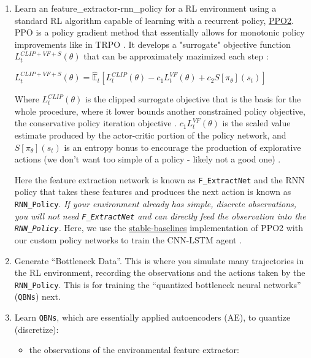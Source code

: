 \begin{enumerate}
\def\labelenumi{\arabic{enumi}.}
\item
  Learn an feature\_extractor-rnn\_policy for a RL environment using a
  standard RL algorithm capable of learning with a recurrent policy,
  \href{https://openai.com/blog/openai-baselines-ppo/}{PPO2}. PPO is a policy gradient method that essentially allows for monotonic policy improvements like in TRPO \cite{TRPO}\cite{PPO2}. It develops a "surrogate" objective function $L_{t}^{C L I P+V F+S}(\theta)$ that can be approximately mazimized each step \cite{PPO2}:
  
  \(L_{t}^{C L I P+V F+S}(\theta)=\hat{\mathbb{E}}_{t}\left[L_{t}^{C L I P}(\theta)-c_{1} L_{t}^{V F}(\theta)+c_{2} S\left[\pi_{\theta}\right]\left(s_{t}\right)\right]\)
  
  Where $L_{t}^{C L I P}(\theta)$ is the clipped surrogate objective that is the basis for the whole procedure, where it lower bounds another constrained policy objective, the conservative policy iteration objective \cite{PPO2}. $c_{1} L_{t}^{V F}(\theta)$ is the scaled value estimate produced by the actor-critic portion of the policy network, and $S\left[\pi_{\theta}\right]\left(s_{t}\right)$ is an entropy bonus to encourage the production of explorative actions (we don't want too simple of a policy - likely not a good one) \cite{PPO2}.
  
  Here the feature extraction network is known as \texttt{F\_ExtractNet} and the
  RNN policy that takes these features and produces the next action is
  known as \texttt{RNN\_Policy}. \emph{If your environment already has
  simple, discrete observations, you will not need
  \texttt{F\_ExtractNet} and can directly feed the observation into the
  \texttt{RNN\_Policy}.} Here, we use the \href{https://stable-baselines.readthedocs.io/}{stable-baselines} implementation of PPO2 with our custom policy networks to train the CNN-LSTM agent \cite{stable-baselines}.
\item
  Generate ``Bottleneck Data''. This is where you simulate many
  trajectories in the RL environment, recording the observations and the
  actions taken by the \texttt{RNN\_Policy}. This is for training the
  ``quantized bottleneck neural networks'' (\texttt{QBNs}) next.
\item
  Learn \texttt{QBNs}, which are essentially applied autoencoders (AE),
  to quantize (discretize):

  \begin{itemize}
  \itemsep1pt\parskip0pt
  \item
    the observations of the environmental feature extractor:


\end{itemize}
\end{enumerate}
